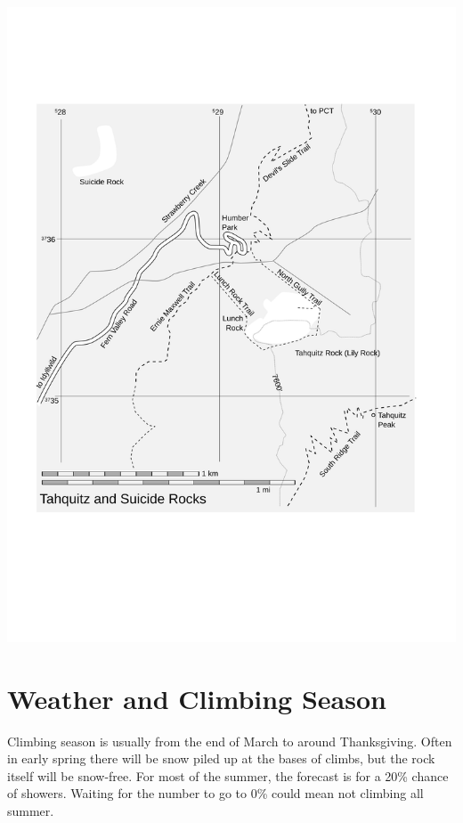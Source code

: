 \documentclass{tahquitz}
\begin{document}
\vspace{10mm}

\includegraphics[width=\linewidth]{figs/large_area_map}

\vfill

\pagebreak


\section{Weather and Climbing Season}

Climbing season is usually from the end of March to around Thanksgiving. Often in early
spring there will be snow piled up at the bases of climbs, but the rock itself will be snow-free.
For most of the summer, the forecast is for a 20\% chance of showers. Waiting for
the number to go to 0\% could mean not climbing all summer.
\end{document}
